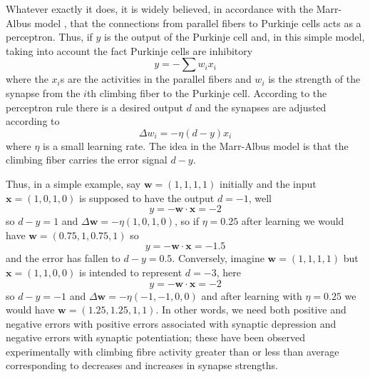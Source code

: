 \documentclass[11pt,a4paper]{scrartcl}
\begin{document}
Whatever exactly it does, it is widely believed, in accordance with
the Marr-Albus model \cite{Marr1969a,Albus1971a}, that the connections
from parallel fibers to Purkinje cells acts as a perceptron. Thus, if
$y$ is the output of the Purkinje cell and, in this simple model,
taking into account the fact Purkinje cells are inhibitory
\begin{equation}
y=-\sum{w_ix_i}
\end{equation}
where the $x_i$s are the activities in the parallel fibers and $w_i$
is the strength of the synapse from the $i$th climbing fiber to the
Purkinje cell. According to the perceptron rule there is a desired output $d$ and the synapses are adjusted according to
\begin{equation}
\Delta w_i=-\eta (d-y)x_i
\end{equation}
where $\eta$ is a small learning rate. The idea in the Marr-Albus
model is that the climbing fiber carries the error signal $d-y$.

Thus, in a simple example, say $\mathbf{w}=(1,1,1,1)$ initially and
the input $\mathbf{x}=(1,0,1,0)$ is supposed to have the output
$d=-1$, well
\begin{equation}
y=-\mathbf{w}\cdot\mathbf{x}=-2
\end{equation}
so $d-y=1$ and $\Delta\mathbf{w}=-\eta(1,0,1,0)$, so if $\eta=0.25$ after learning we would have $\mathbf{w}=(0.75,1,0.75,1)$ so
\begin{equation}
y=-\mathbf{w}\cdot\mathbf{x}=-1.5
\end{equation}
and the error has fallen to $d-y=0.5$. Conversely, imagine
$\mathbf{w}=(1,1,1,1)$ but $\mathbf{x}=(1,1,0,0)$ is intended to
represent $d=-3$, here
\begin{equation}
y=-\mathbf{w}\cdot\mathbf{x}=-2
\end{equation}
so $d-y=-1$ and $\Delta\mathbf{w}=-\eta(-1,-1,0,0)$ and after learning
with $\eta=0.25$ we would have $\mathbf{w}=(1.25,1.25,1,1)$. In other
words, we need both positive and negative errors with positive errors
associated with synaptic depression and negative errors with synaptic
potentiation; these have been observed experimentally
\cite{ItoEtAl1982a,DeanEtAl2010a} with climbing fibre activity greater
than or less than average corresponding to decreases and increases in
synapse strengths.
\end{document}
